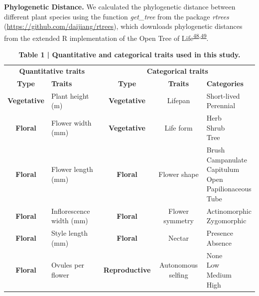 \documentclass[12pt,a4paper,]{article}
\begin{document}
\textbf{Phylogenetic Distance.} We calculated the phylogenetic distance
between different plant species using the function \emph{get\_tree} from
the package \emph{rtrees} (\url{https://github.com/daijiang/rtrees}),
which downloads phylogenetic distances from the extended R
implementation of the Open Tree of
Life\textsuperscript{\protect\hyperlink{ref-smith2018}{48},\protect\hyperlink{ref-jin2019}{49}}.

\singlespacing

\begin{table}

\caption{\label{tab:unnamed-chunk-5}\textbf{Table 1 | Quantitative and categorical traits used in this study.}}
\centering
\fontsize{10}{12}\selectfont
\begin{tabular}[t]{>{}cl>{}ccl}
\toprule
\multicolumn{2}{c}{\textbf{Quantitative traits}} & \multicolumn{3}{c}{\textbf{Categorical traits}} \\
\cmidrule(l{3pt}r{3pt}){1-2} \cmidrule(l{3pt}r{3pt}){3-5}
\textbf{Type} & \textbf{Traits} & \textbf{Type} & \textbf{Traits} & \textbf{Categories}\\
\midrule
\textbf{Vegetative} & Plant height (m) & \textbf{Vegetative} & Lifepan & \makecell[l]{Short-lived \\ Perennial}\\
\addlinespace
\textbf{Floral} & Flower width (mm) & \textbf{Vegetative} & Life form & \makecell[l]{Herb \\ Shrub \\ Tree}\\
\addlinespace
\textbf{Floral} & Flower length (mm) & \textbf{Floral} & Flower shape & \makecell[l]{Brush \\ Campanulate \\ Capitulum \\ Open \\ Papilionaceous \\ Tube}\\
\addlinespace
\textbf{Floral} & Inflorescence width (mm) & \textbf{Floral} & Flower symmetry & \makecell[l]{Actinomorphic \\ Zygomorphic}\\
\addlinespace
\textbf{Floral} & Style length (mm) & \textbf{Floral} & Nectar & \makecell[l]{Presence \\ Absence}\\
\addlinespace
\textbf{Floral} & Ovules per flower & \textbf{Reproductive} & Autonomous selfing & \makecell[l]{None \\ Low \\ Medium \\ High}\\

\end{tabular}
\end{table}
\end{document}
